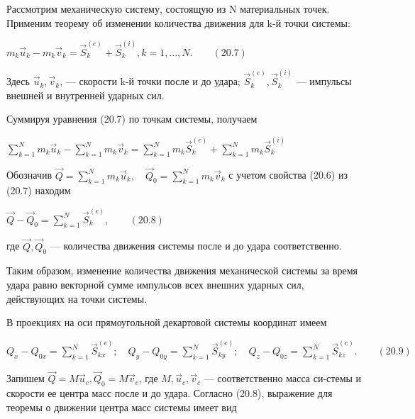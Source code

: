 {\begin{center}
\par Рассмотрим  механическую  систему,  состоящую  из  N  материальных  точек. Применим теорему  об  изменении количества  движения  для k-й точки системы:

\par $m_k \vec{u}_k - m_k \vec{v}_k = 
\vec{S}_k^{(e)} + \vec{S}_k^{(i)}, k = 1, \dots, N. \quad\quad (20.7)$

\par Здесь $\vec{u}_k, \vec{v}_k$,  — скорости  k-й точки  после и  до удара; $\vec{S}_k^{(e)}, \vec{S}_k^{(i)}$  — импульсы внешней и внутренней ударных сил.

\par Суммируя уравнения (20.7) по точкам системы, получаем

\par $\sum\limits_{k=1}^N m_k \vec{u}_k - \sum\limits_{k=1}^N m_k \vec{v}_k = \sum\limits_{k=1}^N m_k \vec{S}_k^{(e)} + \sum\limits_{k=1}^N m_k \vec{S}_k^{(i)}$

\par Обозначив $\vec{Q} = \sum\limits_{k=1}^N m_k \vec{u}_k, \quad \vec{Q}_0 = \sum\limits_{k=1}^N m_k \vec{v}_k$ с  учетом  свойства  (20.6)  из  (20.7) находим

\par $\vec{Q} - \vec{Q}_0 = \sum\limits_{k=1}^N \vec{S}_k^{(e)}, \quad\quad (20.8)$

\par где $\vec{Q}, \vec{Q}_0$ — количества движения системы после и до удара соответственно.

\par Таким образом, изменение количества движения механической системы за время удара  равно векторной  сумме импульсов  всех внешних  ударных сил,  действующих на точки системы.

\par В проекциях на оси прямоугольной декартовой системы координат имеем

\par ${Q}_x - {Q}_{0x} = \sum\limits_{k=1}^N \vec{S}_{kx}^{(e)}; \quad {Q}_y - {Q}_{0y} = \sum\limits_{k=1}^N \vec{S}_{ky}^{(e)}; \quad {Q}_z - {Q}_{0z} = \sum\limits_{k=1}^N \vec{S}_{kz}^{(e)}. \quad\quad (20.9)$

\par Запишем  $\vec{Q} = M \vec{u}_c, \vec{Q}_0 = M \vec{v}_c$, где $M, \vec{u}_c, \vec{v}_c$  — соответственно масса си-стемы и скорости ее центра масс после и до удара. Согласно (20.8), выражение для теоремы о движении центра масс системы имеет вид


\end{center}}
